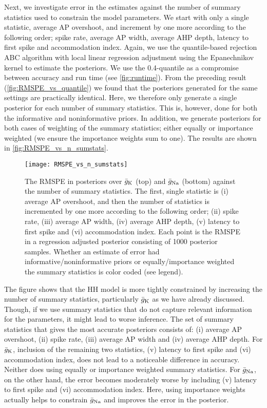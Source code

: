 Next, we investigate error in the estimates against the number of summary statistics used to constrain the model parameters. We start with only a single statistic, average AP overshoot, and increment by one more according to the following order; spike rate, average AP width, average AHP depth, latency to first spike and accommodation index. Again, we use the quantile-based rejection ABC algorithm with local linear regression adjustment using the Epanechnikov kernel to estimate the posteriors. We use the 0.4-quantile as a compromise between accuracy and run time (see \autoref{fig:runtime}). From the preceding result (\autoref{fig:RMSPE_vs_quantile}) we found that the posteriors generated for the same settings are practically identical. Here, we therefore only generate a single posterior for each number of summary statistics. This is, however, done for both the informative and noninformative priors. In addition, we generate posteriors for both cases of weighting of the summary statistics; either equally or importance weighted (we ensure the importance weights sum to one). The results are shown in \autoref{fig:RMSPE_vs_n_sumstats}.
\begin{figure}[!htb]
    \centering
    \texttt{[image: RMSPE\_vs\_n\_sumstats]}
    \caption{The RMSPE in posteriors over $\bar{g}_{\mathrm{K}}$ (top) and $\bar{g}_{\mathrm{Na}}$ (bottom) against the number of summary statistics. The first, single statistic is (i) average AP overshoot, and then the number of statistics is incremented by one more according to the following order; (ii) spike rate, (iii) average AP width, (iv) average AHP depth, (v) latency to first spike and (vi) accommodation index. Each point is the RMSPE in a regression adjusted posterior consisting of 1000 posterior samples. Whether an estimate of error had informative/noninformative priors or equally/importance weighted the summary statistics is color coded (see legend).
    }
    \label{fig:RMSPE_vs_n_sumstats}
\end{figure} 
The figure shows that the HH model is more tightly constrained by increasing the number of summary statistics, particularly $\bar{g}_{\mathrm{K}}$ as we have already discussed. Though, if we use summary statistics that do not capture relevant information for the parameters, it might lead to worse inference. The set of summary statistics that gives the most accurate posteriors consists of: (i) average AP overshoot, (ii) spike rate, (iii) average AP width and (iv) average AHP depth. For $\bar{g}_{\mathrm{K}}$, inclusion of the remaining two statistics, (v) latency to first spike and (vi) accommodation index, does not lead to a noticeable difference in accuracy. Neither does using equally or importance weighted summary statistics. For $\bar{g}_{\mathrm{Na}}$, on the other hand, the error becomes moderately worse by including (v) latency to first spike and (vi) accommodation index. Here, using importance weights actually helps to constrain $\bar{g}_{\mathrm{Na}}$ and improves the error in the posterior. 

